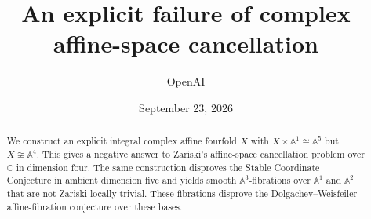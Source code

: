 \documentclass[11pt]{article}
\title{An explicit failure of complex affine-space cancellation}
\author{OpenAI}
\date{September 23, 2026}
\begin{document}
\maketitle
\begin{abstract}
We construct an explicit integral complex affine fourfold $X$ with
$X\times\mathbb A^1\cong\mathbb A^5$ but
$X\not\cong\mathbb A^4$. This gives a negative answer to Zariski's
affine-space cancellation problem over $\mathbb C$ in dimension four.
The same construction disproves the Stable Coordinate Conjecture in
ambient dimension five and yields smooth $\mathbb A^3$-fibrations over
$\mathbb A^1$ and $\mathbb A^2$ that are not Zariski-locally trivial.
These fibrations disprove the Dolgachev--Weisfeiler affine-fibration
conjecture over these bases.
\end{abstract}








\end{document}
